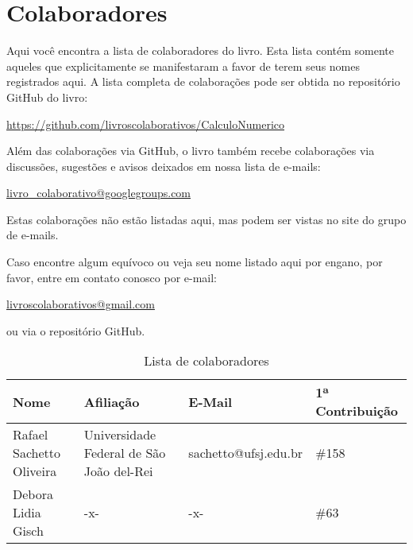 
%
%
%

\chapter*{Colaboradores}
\fancyhead[LE,RO]{\thepage}

Aqui você encontra a lista de colaboradores do livro. Esta lista contém somente aqueles que explicitamente se manifestaram a favor de terem seus nomes registrados aqui. A lista completa de colaborações pode ser obtida no repositório GitHub do livro:
\begin{center}
  \url{https://github.com/livroscolaborativos/CalculoNumerico}
\end{center}
Além das colaborações via GitHub, o livro também recebe colaborações via discussões, sugestões e avisos deixados em nossa lista de e-mails:
\begin{center}
\url{livro_colaborativo@googlegroups.com}
\end{center}
Estas colaborações não estão listadas aqui, mas podem ser vistas no site do grupo de e-mails.

Caso encontre algum equívoco ou veja seu nome listado aqui por engano, por favor, entre em contato conosco por e-mail:
\begin{center}
  \url{livroscolaborativos@gmail.com}
\end{center}
ou via o repositório GitHub.

\begin{table}[h!]
  \centering
  \caption{Lista de colaboradores}
  \label{tab:colaboradores}
  \begin{tabular}{llll} \hline
    Nome & Afiliação & E-Mail & 1ª Contribuição\\ \hline
    Rafael Sachetto Oliveira & Universidade Federal de São João del-Rei & sachetto@ufsj.edu.br & \#158 \\
    Debora Lidia Gisch & -x- & -x- & \#63 \\
    \hline
  \end{tabular}
\end{table}
